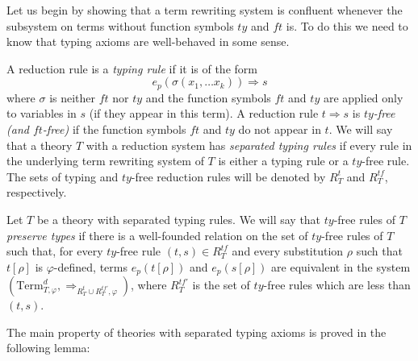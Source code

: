 \documentclass[reqno]{amsart}
\theoremstyle{definition}
\theoremstyle{remark}
\newcommand{\Term}{\mathrm{Term}}
\newcommand{\ft}{\mathit{ft}}
\newcommand{\ty}{\mathit{ty}}
\numberwithin{figure}{section}
\begin{document}
Let us begin by showing that a term rewriting system is confluent whenever the subsystem on terms without function symbols $\ty$ and $\ft$ is.
To do this we need to know that typing axioms are well-behaved in some sense.
\begin{defn}
A reduction rule is a \emph{typing rule} if it is of the form
\[ e_p(\sigma(x_1, \ldots x_k)) \Rightarrow s \]
where $\sigma$ is neither $\ft$ nor $\ty$ and the function symbols $\ft$ and $\ty$ are applied only to variables in $s$ (if they appear in this term).
A reduction rule $t \Rightarrow s$ is \emph{$\ty$-free (and $\ft$-free)} if the function symbols $\ft$ and $\ty$ do not appear in $t$.
We will say that a theory $T$ with a reduction system has \emph{separated typing rules} if every rule in the underlying term rewriting system of $T$ is either a typing rule or a $\ty$-free rule.
The sets of typing and $\ty$-free reduction rules will be denoted by $R^t_T$ and $R^{tf}_T$, respectively.

Let $T$ be a theory with separated typing rules.
We will say that $\ty$-free rules of $T$ \emph{preserve types} if there is a well-founded relation on the set of $\ty$-free rules of $T$ such that,
for every $\ty$-free rule $(t,s) \in R^{tf}_T$ and every substitution $\rho$ such that $t[\rho]$ is $\varphi$-defined,
terms $e_p(t[\rho])$ and $e_p(s[\rho])$ are equivalent in the system $(\Term_{T,\varphi}^d,\Rightarrow_{R^t_T \cup R^{tf'}_T, \varphi})$,
where $R^{tf'}_T$ is the set of $\ty$-free rules which are less than $(t,s)$.
\end{defn}

The main property of theories with separated typing axioms is proved in the following lemma:
\end{document}
